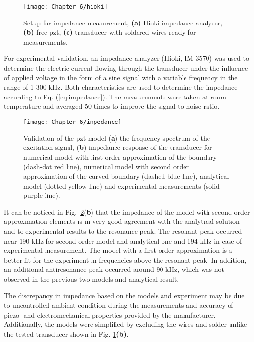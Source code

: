 \begin{figure}[H]
	\begin{center}
		\texttt{[image: Chapter\_6/hioki]}
	\end{center}
	\caption{Setup for impedance measurement, \textbf{(a)} Hioki impedance analyser, \textbf{(b)} free \ac{pzt}, \textbf{(c)} transducer with soldered wires ready for measurements.}
	\label{fig:hioki}
\end{figure}
For experimental validation, an impedance analyzer (Hioki, IM 3570) was used to determine the electric current flowing through the transducer under the influence of applied voltage in the form of a sine signal with a variable frequency in the range of 1-300 \unit{\kHz}.
Both characteristics are used to determine the impedance according to Eq. (\ref{eq:impedance}).
The measurements were taken at room temperature and averaged 50 times to improve the signal-to-noise ratio.

\begin{figure}[H]
	\begin{center}
		\texttt{[image: Chapter\_6/impedance]}
	\end{center}
	\caption{Validation of the \acf{pzt} model (\textbf{a}) the frequency spectrum of the excitation signal, (\textbf{b}) impedance response of the transducer for numerical model with first order approximation of the boundary (dash-dot red line), numerical model with second order approximation of the curved boundary (dashed blue line), analytical model (dotted yellow line) and experimental measurements (solid purple line).}
	\label{fig:impedance}
\end{figure}

It can be noticed in Fig.~\ref{fig:impedance}(\textbf{b}) that the impedance of the model with second order approximation elements is in very good agreement with the analytical solution and to experimental results to the resonance peak.
The resonant peak occurred near 190 \unit{\kHz} for second order model and analytical one and 194 \unit{\kHz} in case of experimental measurement.
The model with a first-order approximation is a better fit for the experiment in frequencies above the resonant peak.
In addition, an additional antiresonance peak occurred around 90 \unit{\kHz}, which was not observed in the previous two models and analytical result.

The discrepancy in impedance based on the models and experiment may be due to uncontrolled ambient condition during the measurements and accuracy of piezo- and electromechanical properties provided by the manufacturer. 
Additionally, the models were simplified by excluding the wires and solder unlike the tested transducer shown in Fig. \ref{fig:hioki}\textbf{(b)}.